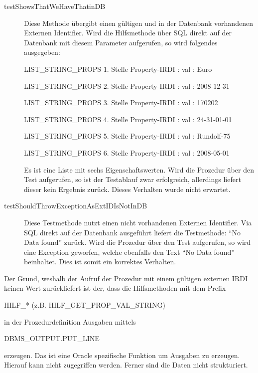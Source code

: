 \begin{description}
\item[ testShowsThatWeHaveThatinDB] Diese Methode übergibt einen gültigen und in der Datenbank vorhandenen Externen Identifier. Wird die Hilfsmethode über SQL direkt auf der Datenbank mit diesem Parameter aufgerufen, so wird folgendes ausgegeben:

  LIST\_STRING\_PROPS 1. Stelle
  Property-IRDI :  val : Euro
  
  LIST\_STRING\_PROPS 2. Stelle
  Property-IRDI :  val : 2008-12-31
  
  LIST\_STRING\_PROPS 3. Stelle
  Property-IRDI :  val : 170202
  
  LIST\_STRING\_PROPS 4. Stelle
  Property-IRDI :  val : 24-31-01-01
  
  LIST\_STRING\_PROPS 5. Stelle
  Property-IRDI :  val : Rundolf-75
  
  LIST\_STRING\_PROPS 6. Stelle
  Property-IRDI :  val : 2008-05-01
  
Es ist eine Liste mit sechs Eigenschaftswerten.
Wird die Prozedur über den Test aufgerufen, so ist der Testablauf zwar erfolgreich, allerdings liefert dieser kein Ergebnis zurück. Dieses Verhalten wurde nicht erwartet. 
  
\item[ testShouldThrowExceptionAsExtIDIsNotInDB] Diese Testmethode nutzt einen nicht vorhandenen Externen Identifier. Via SQL direkt auf der Datenbank ausgeführt liefert die Testmethode: \enquote{No Data found} zurück. 
Wird die Prozedur über den Test aufgerufen, so wird eine Exception geworfen, welche ebenfalls den Text  \enquote{No Data found} beinhaltet. Dies ist somit ein korrektes Verhalten. 
\end{description}

Der Grund, weshalb der Aufruf der Prozedur mit einem gültigen externen \gls{IRDI} keinen Wert zurückliefert ist der, dass die Hilfsmethoden mit dem Prefix 

HILF\_* (z.B. HILF\_GET\_PROP\_VAL\_STRING) 

in der Prozedurdefinition Ausgaben mittels 

DBMS\_OUTPUT.PUT\_LINE 

erzeugen. Das ist eine Oracle spezifische Funktion um Ausgaben zu erzeugen. Hierauf kann nicht zugegriffen werden. Ferner sind die Daten nicht strukturiert.   

